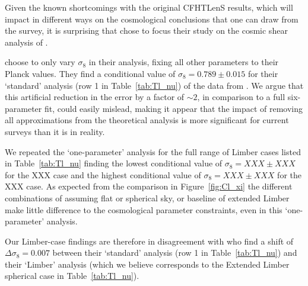 Given the known shortcomings with the original CFHTLenS results, which will impact in different ways on the cosmological conclusions that one can draw from the survey, it is surprising that \citet{kitching/etal:2016} chose to focus their study on the cosmic shear analysis of \citet{kilbinger/etal:2013}.  

\citet{kitching/etal:2016} choose to only vary $\sigma_8$ in their analysis, fixing all other parameters to their Planck values. They find a conditional value of $\sigma_8 = 0.789 \pm 0.015$ for their `standard' analysis (row 1 in Table~\ref{tab:Tl_nu}) of the data from \citet{kilbinger/etal:2013}.    We argue that this artificial reduction in the error by a factor of $\sim 2$, in comparison to a full six-parameter fit, could easily mislead, making it appear that the impact of removing all approximations from the theoretical analysis is more significant for current surveys than it is in reality.

We repeated the `one-parameter' analysis for the full range of Limber cases listed in Table~\ref{tab:Tl_nu} finding the lowest conditional value of $\sigma_8 = XXX \pm XXX$ for the XXX case and the highest conditional value of $\sigma_8 = XXX \pm XXX$ for the XXX case.  As expected from the comparison in Figure~\ref{fig:Cl_xi} the different combinations of assuming flat or spherical sky, or baseline of extended Limber make little difference to the cosmological parameter constraints, even in this `one-parameter' analysis.  

Our Limber-case findings are therefore in disagreement with \citet{kitching/etal:2016} who find a shift of $\Delta \sigma_8 = 0.007$ between their `standard' analysis (row 1 in Table~\ref{tab:Tl_nu}) and their `Limber' analysis (which we believe corresponds to the Extended Limber spherical case in Table~\ref{tab:Tl_nu}).


